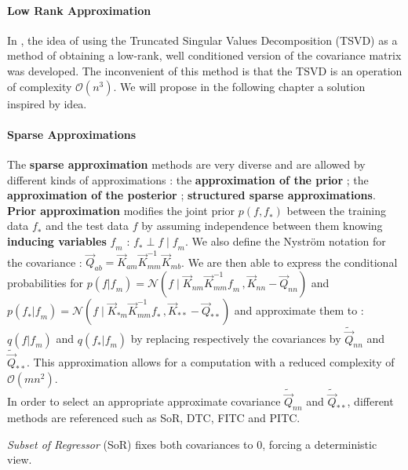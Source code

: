  \paragraph{Low Rank Approximation}
 
 In \citet{foster_stable_2009}, the idea of using the Truncated Singular Values Decomposition (TSVD) as a method of obtaining a low-rank, well conditioned version of the covariance matrix was developed. The inconvenient of this method is that the TSVD is an operation of complexity $\mathcal{O}(n^3)$. We will propose in the following chapter a solution inspired by idea. 

\paragraph{Sparse Approximations}

The \textbf{sparse approximation} methods are very diverse and are allowed by different kinds of approximations : the \textbf{approximation of the prior} ; the \textbf{approximation of the posterior} ; \textbf{structured sparse approximations}. \\

\textbf{Prior approximation} modifies the joint prior $p(\mathit{f,f_*})$ between the training data $\mathit{f}_*$ and the test data $\mathit{f}$ by assuming independence between them knowing \textbf{inducing variables} $\mathit{f}_m$ : $\mathit{f}_* \perp \mathit{f} \; | \; \mathit{f}_m$. We also define the Nyström notation for the covariance : $\vec{Q}_{ab} = \vec{K}_{am} \vec{K}_{mm}^{-1} \vec{K}_{mb} $. We are then able to express the conditional probabilities for $p(\mathit{f} | \mathit{f}_m) = \mathcal{N}(\mathit{f} \; | \; \vec{K}_{nm}\vec{K}_{mm}^{-1}\mathit{f}_m \, , \vec{K}_{nn} - \vec{Q}_{nn})$ and  $p(\mathit{f}_* | \mathit{f}_m)  = \mathcal{N}(\mathit{f} \; | \; \vec{K}_{*m}\vec{K}_{mm}^{-1}\mathit{f}_* \, , \vec{K}_{**} - \vec{Q}_{**})$  and approximate them to : $q(\mathit{f} | \mathit{f}_m)$ and  $q(\mathit{f}_* | \mathit{f}_m)$ by replacing respectively the covariances by   $\tilde{\vec{Q}}_{nn}$ and $\tilde{\vec{Q}}_{**}$. This approximation allows for a computation with a reduced complexity of $\mathcal{O}(mn^2)$. \\

 In order to select an appropriate approximate covariance $\tilde{\vec{Q}}_{nn}$ and $\tilde{\vec{Q}}_{**}$, different methods are referenced such as  SoR, DTC, FITC and PITC.
 
 
 \textit{Subset of Regressor} (SoR) fixes both covariances to $0$, forcing a deterministic view. 
 
